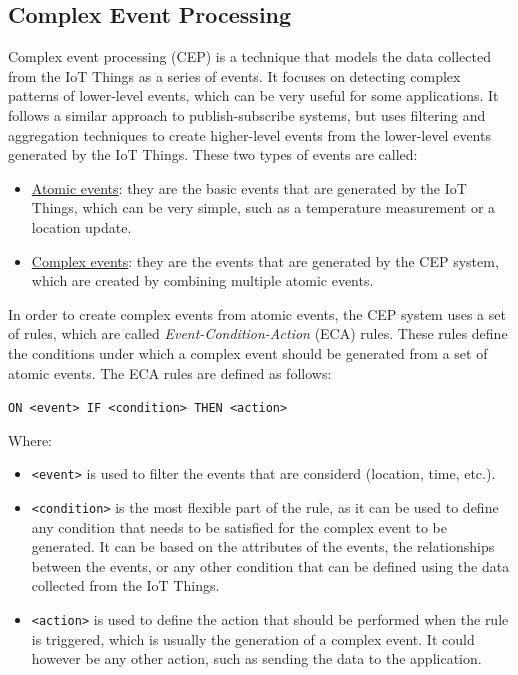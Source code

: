 \subsection{Complex Event Processing}

Complex event processing (CEP) is a technique that models the data collected from the IoT Things as a series of events. It focuses on detecting complex patterns of lower-level events, which can be very useful for some applications. It follows a similar approach to publish-subscribe systems, but uses filtering and aggregation techniques to create higher-level events from the lower-level events generated by the IoT Things. These two types of events are called:
\begin{itemize}
    \item \ul{Atomic events}: they are the basic events that are generated by the IoT Things, which can be very simple, such as a temperature measurement or a location update.
    \item \ul{Complex events}: they are the events that are generated by the CEP system, which are created by combining multiple atomic events.
\end{itemize}

In order to create complex events from atomic events, the CEP system uses a set of rules, which are called \emph{Event-Condition-Action} (ECA) rules. These rules define the conditions under which a complex event should be generated from a set of atomic events. The ECA rules are defined as follows:
\begin{center}
\texttt{ON <event> IF <condition> THEN <action>}
\end{center}
Where:
\begin{itemize}
    \item \texttt{<event>} is used to filter the events that are considerd (location, time, etc.).
    \item \texttt{<condition>} is the most flexible part of the rule, as it can be used to define any condition that needs to be satisfied for the complex event to be generated. It can be based on the attributes of the events, the relationships between the events, or any other condition that can be defined using the data collected from the IoT Things.
    \item \texttt{<action>} is used to define the action that should be performed when the rule is triggered, which is usually the generation of a complex event. It could however be any other action, such as sending the data to the application.
\end{itemize}


